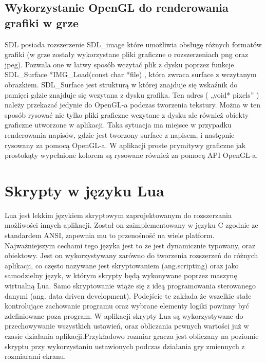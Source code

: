 \subsection{Wykorzystanie OpenGL do renderowania grafiki w grze}
SDL posiada rozszerzenie SDL\_image które umożliwia obsługę różnych formatów grafiki (w grze zostały wykorzystane pliki graficzne o rozszerzeniach png oraz jpeg). Pozwala one w łatwy sposób wczytać plik z dysku poprzez funkcje SDL\_Surface *IMG\_Load(const char *file) , która zwraca surface z
wczytanym obrazkiem. SDL\_Surface jest strukturą w której znajduje się wskaźnik do pamięci gdzie znajduje się wczytana z dysku grafika. Ten adres (
„void* pixels” ) należy przekazać jedynie do OpenGL-a podczas tworzenia tekstury.
Można w ten sposób rysować nie tylko pliki graficzne wczytane z dysku ale również obiekty graficzne utworzone w aplikacji. Taka sytuacja ma miejsce w
przypadku renderowania napisów, gdzie jest tworzony surface z napisem, i następnie rysowany za pomocą OpenGL-a. W aplikacji proste prymitywy graficzne
jak prostokąty wypełnione kolorem są rysowane również za pomocą API OpenGL-a.


\section{Skrypty w języku Lua}
Lua jest lekkim językiem skryptowym zaprojektowanym do rozszerzania możliwości innych aplikacji. Został on zaimplementowany w języku C zgodnie ze standardem ANSI, zapewnia mu to przenośność na wiele platform. Najważniejszym cechami tego języka jest to że jest dynamicznie typowany, oraz obiektowy. Jest on wykorzystywany zarówno do tworzenia rozszerzeń do różnych aplikacji, co często nazywane jest skryptowaniem (ang.scripting) oraz jako samodzielny język, w którym skrypty będą wykonywane poprzez maszynę wirtualną Lua. Samo skryptowanie wiąże się z ideą programowania sterowanego danymi (ang. data driven development).
Podejście te zakłada że wszelkie stałe kontrolujące zachowanie programu oraz wybrane elementy logiki powinny być zdefiniowane poza program. W aplikacji skrypty Lua są wykorzystywane do przechowywanie wszystkich ustawień, oraz obliczania pewnych wartości 
już w czasie działania aplikacji.Przykładowo rozmiar gracza jest obliczany na poziomie skryptu przy wykorzystaniu ustawionych podczas działania gry zmiennych z rozmiarami ekranu. 

